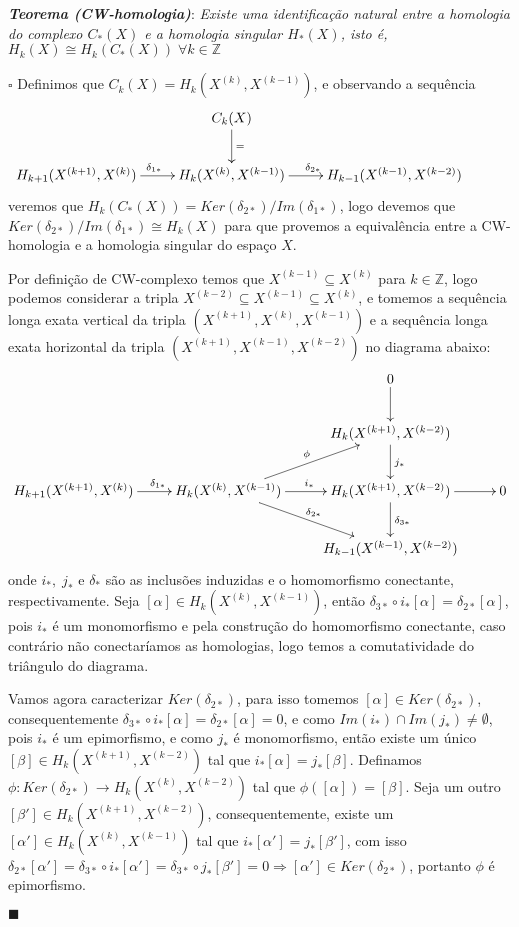 \documentclass[12pt]{book}
\newcommand{\classe}[1]{[#1]}
\newcommand{\skeleton}[1]{X^{(#1)}}
\newcommand{\homologia}[2]{H_{#1}(#2)}
\newcommand{\homologiarelskele}[3]{H_{#1}(X^{(#2)}, X^{(#3)})}
\newcommand{\homologiarelskelesimpl}[2]{H_{#1}(X^{(#2)}, X^{(#2-1)})}
\newcommand{\tese}[3]{\vspace{2mm} \textit{\textbf{#1}}: \textit{#2} \par $\square$ #3 \par $\blacksquare$}
\begin{document}
	
	\tese{Teorema (CW-homologia)}{Existe uma identificação natural entre a homologia do complexo $C_{*}(X)$ e a homologia singular $\homologia{*}{X}$, isto é, $\homologia{k}{X} \cong \homologia{k}{C_{*}(X)}\; \forall k \in \mathbb{Z}$}
	{
	Definimos que $C_{k}(X) = \homologiarelskelesimpl{k}{k}$, e observando a sequência
	\[
	\xymatrix{
		& C_{k}(X) \ar[d]^{=}& &
		\\
		\homologiarelskele{k+1}{k+1}{k} \ar[r]^{\delta_{1*}} & \homologiarelskele{k}{k}{k-1} \ar[r]^{\delta_{2*}} & \homologiarelskele{k-1}{k-1}{k-2} &
	}
	\]
	veremos que $\homologia{k}{C_{*}(X)} = Ker(\delta_{2*})/Im(\delta_{1*})$, logo devemos que $Ker(\delta_{2*})/Im(\delta_{1*}) \cong \homologia{k}{X}$ para que provemos a equivalência entre a CW-homologia e a homologia singular do espaço $X$.
	
	\vspace{2mm} Por definição de CW-complexo temos que $\skeleton{k-1} \subseteq \skeleton{k}$ para $k \in \mathbb{Z}$, logo podemos considerar a tripla $\skeleton{k-2} \subseteq \skeleton{k-1} \subseteq \skeleton{k}$, e tomemos a sequência longa exata vertical da tripla $(\skeleton{k+1}, \skeleton{k}, \skeleton{k-1})$ e a sequência longa exata horizontal da tripla $(\skeleton{k+1}, \skeleton{k-1}, \skeleton{k-2})$  no diagrama abaixo:
	\[
	\xymatrix{
		& & 0 \ar[d] &
		\\
		& & \homologiarelskele{k}{k+1}{k-2} \ar[d]^{j_{*}} &
		\\
		\homologiarelskele{k+1}{k+1}{k} \ar[r]^{\quad\delta_{1*}} &		\homologiarelskele{k}{k}{k-1} \ar[r]^{i_{*}} \ar[rd]^{\delta_{2*}} \ar[ru]^{\phi}& \homologiarelskele{k}{k+1}{k-2} \ar[r] \ar[d]^{\delta_{3*}} & 0
		\\
		& & \homologiarelskele{k-1}{k-1}{k-2} &
	}
	\]	
	onde $i_{*}, \; j_{*}$ e $\delta_{*}$ são as inclusões induzidas e o homomorfismo conectante, respectivamente. Seja $\classe{\alpha} \in \homologiarelskelesimpl{k}{k}$, então $\delta_{3*}\circ i_{*}\classe{\alpha} = \delta_{2*}\classe{\alpha}$, pois $i_{*}$ é um monomorfismo e pela construção do homomorfismo conectante, caso contrário não conectaríamos as homologias, logo temos a comutatividade do triângulo do diagrama.
	
	\vspace{2mm} Vamos agora caracterizar $Ker(\delta_{2*})$, para isso tomemos $\classe{\alpha} \in Ker(\delta_{2*})$, consequentemente $\delta_{3*}\circ i_{*}\classe{\alpha} = \delta_{2*}\classe{\alpha} = 0$, e como $Im(i_{*})\cap Im(j_{*}) \neq \emptyset$, pois $i_{*}$ é um epimorfismo, e como $j_{*}$ é monomorfismo, então existe um único $\classe{\beta} \in \homologiarelskele{k}{k+1}{k-2}$ tal que $i_{*} \classe{\alpha} = j_{*} \classe{\beta}$. Definamos $\phi: Ker(\delta_{2*}) \to \homologiarelskele{k}{k}{k-2}$ tal que $\phi(\classe{\alpha}) = \classe{\beta}$. Seja um outro $\classe{\beta'} \in \homologiarelskele{k}{k+1}{k-2}$, consequentemente, existe um $\classe{\alpha'} \in \homologiarelskele{k}{k}{k-1}$ tal que $i_{*} \classe{\alpha'} = j_{*} \classe{\beta'}$, com isso $\delta_{2*}\classe{\alpha'} = \delta_{3*}\circ i_{*}\classe{\alpha'} = \delta_{3*}\circ j_{*}\classe{\beta'} = 0 \Rightarrow \classe{\alpha'} \in Ker(\delta_{2*})$, portanto $\phi$ é epimorfismo.
	
}
\end{document}
